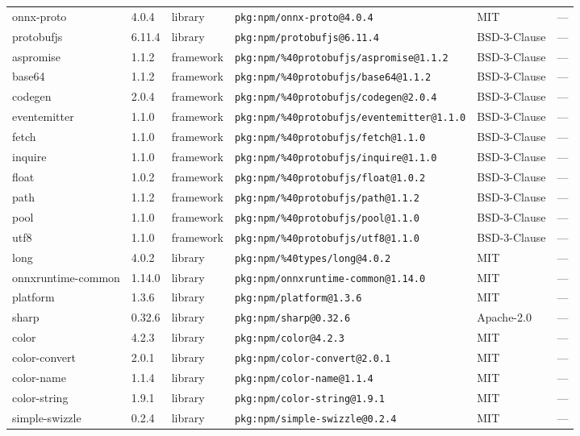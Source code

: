 \documentclass[11pt]{article}
\begin{document}
\begin{longtable}{|l|l|l|p{2.2cm}|l|p{4cm}|}
onnx-proto & 4.0.4 & library & \texttt{pkg:npm/onnx-proto@4.0.4} & MIT & — \\
protobufjs & 6.11.4 & library & \texttt{pkg:npm/protobufjs@6.11.4} & BSD-3-Clause & — \\
aspromise & 1.1.2 & framework & \texttt{pkg:npm/\%40protobufjs/aspromise@1.1.2} & BSD-3-Clause & — \\
base64 & 1.1.2 & framework & \texttt{pkg:npm/\%40protobufjs/base64@1.1.2} & BSD-3-Clause & — \\
codegen & 2.0.4 & framework & \texttt{pkg:npm/\%40protobufjs/codegen@2.0.4} & BSD-3-Clause & — \\
eventemitter & 1.1.0 & framework & \texttt{pkg:npm/\%40protobufjs/eventemitter@1.1.0} & BSD-3-Clause & — \\
fetch & 1.1.0 & framework & \texttt{pkg:npm/\%40protobufjs/fetch@1.1.0} & BSD-3-Clause & — \\
inquire & 1.1.0 & framework & \texttt{pkg:npm/\%40protobufjs/inquire@1.1.0} & BSD-3-Clause & — \\
float & 1.0.2 & framework & \texttt{pkg:npm/\%40protobufjs/float@1.0.2} & BSD-3-Clause & — \\
path & 1.1.2 & framework & \texttt{pkg:npm/\%40protobufjs/path@1.1.2} & BSD-3-Clause & — \\
pool & 1.1.0 & framework & \texttt{pkg:npm/\%40protobufjs/pool@1.1.0} & BSD-3-Clause & — \\
utf8 & 1.1.0 & framework & \texttt{pkg:npm/\%40protobufjs/utf8@1.1.0} & BSD-3-Clause & — \\
long & 4.0.2 & library & \texttt{pkg:npm/\%40types/long@4.0.2} & MIT & — \\
onnxruntime-common & 1.14.0 & library & \texttt{pkg:npm/onnxruntime-common@1.14.0} & MIT & — \\
platform & 1.3.6 & library & \texttt{pkg:npm/platform@1.3.6} & MIT & — \\
sharp & 0.32.6 & library & \texttt{pkg:npm/sharp@0.32.6} & Apache-2.0 & — \\
color & 4.2.3 & library & \texttt{pkg:npm/color@4.2.3} & MIT & — \\
color-convert & 2.0.1 & library & \texttt{pkg:npm/color-convert@2.0.1} & MIT & — \\
color-name & 1.1.4 & library & \texttt{pkg:npm/color-name@1.1.4} & MIT & — \\
color-string & 1.9.1 & library & \texttt{pkg:npm/color-string@1.9.1} & MIT & — \\
simple-swizzle & 0.2.4 & library & \texttt{pkg:npm/simple-swizzle@0.2.4} & MIT & — \\

\end{longtable}
\end{document}
